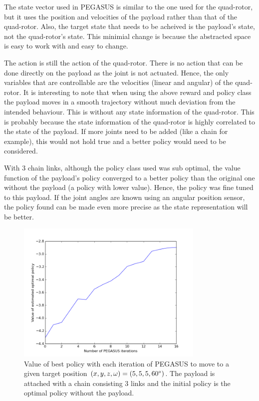 \documentclass[hidelinks,BTech]{iitmdiss}
\begin{document}
The state vector used in PEGASUS is similar to the one used for the quad-rotor, but it uses the position and velocities of the payload rather than that of the quad-rotor. Also, the target state that needs to be acheived is the payload's state, not the quad-rotor's state. This minimial change is because the abstracted space is easy to work with and easy to change.

The action is still the action of the quad-rotor. There is no action that can be done directly on the payload as the joint is not actuated. Hence, the only variables that are controllable are the velocities (linear and angular) of the quad-rotor. It is interesting to note that when using the above reward and policy class the payload moves in a smooth trajectory without much deviation from the intended behaviour. This is without any state information of the quad-rotor. This is probably because the state information of the quad-rotor is highly correlated to the state of the payload. If more joints need to be added (like a chain for example), this would not hold true and a better policy would need to be considered.

With 3 chain links, although the policy class used was sub optimal, the value function of the payload's policy converged to a better policy than the original one without the payload (a policy with lower value). Hence, the policy was fine tuned to this payload. If the joint angles are known using an angular position sensor, the policy found can be made even more precise as the state representation will be better.

\begin{figure}[H]
  \centering
    \includegraphics[width=0.8\textwidth]{payload_position_control_time.png}
    \caption{Value of best policy with each iteration of PEGASUS to move to a given target position $(x, y, z, \omega) = (5, 5, 5, 60\protect^{\circ})$. The payload is attached with a chain consisting 3 links and the initial policy is the optimal policy without the payload.}
\end{figure}
\end{document}

